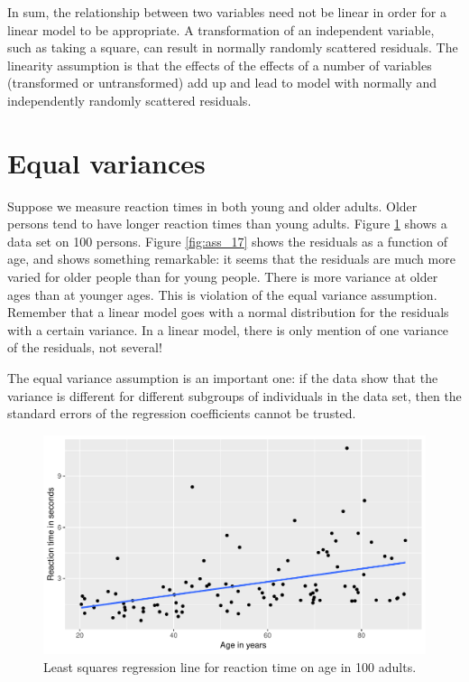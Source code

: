 \documentclass[]{report}\usepackage[]{graphicx}\usepackage[]{color}
\makeatletter
\def\maxwidth{ %
  \ifdim\Gin@nat@width>\linewidth
    \linewidth
  \else
    \Gin@nat@width
  \fi
}
\newenvironment{knitrout}{}{} %
\makeatother
\begin{document}
In sum, the relationship between two variables need not be linear in order for a linear model to be appropriate. A transformation of an independent variable, such as taking a square, can result in normally randomly scattered residuals. The linearity assumption is that the effects of the effects of a number of variables (transformed or untransformed) add up and lead to model with normally and  independently randomly scattered residuals.


\section{Equal variances}

Suppose we measure reaction times in both young and older adults. Older persons tend to have longer reaction times than young adults. Figure \ref{fig:ass_16} shows a data set on 100 persons. Figure \ref{fig:ass_17} shows the residuals as a function of age, and shows something remarkable: it seems that the residuals are much more varied for older people than for young people. There is more variance at older ages than at younger ages. This is violation of the equal variance assumption. Remember that a linear model goes with a normal distribution for the residuals with a certain variance. In a linear model, there is only mention of one variance of the residuals, not several!

The equal variance assumption is an important one: if the data show that the variance is different for different subgroups of individuals in the data set, then the standard errors of the regression coefficients cannot be trusted. 

\begin{knitrout}
\color{fgcolor}\begin{figure}

{\centering \includegraphics[width=\maxwidth]{figure/ass_16-1} 

}

\caption[Least squares regression line for reaction time on age in 100 adults]{Least squares regression line for reaction time on age in 100 adults.}\label{fig:ass_16}
\end{figure}


\end{knitrout}
\end{document}
